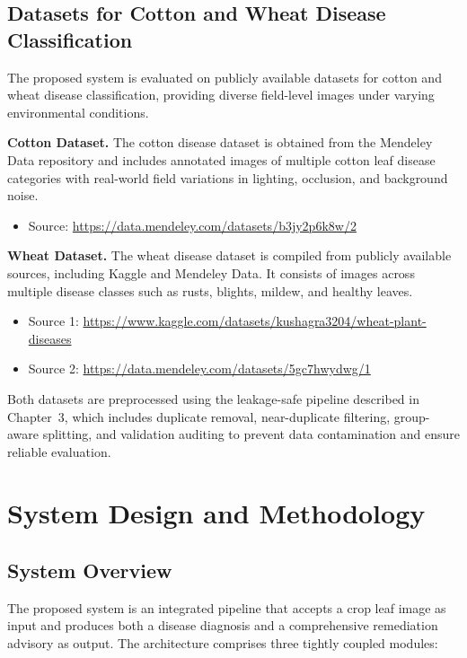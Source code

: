 \documentclass[12pt,a4paper]{report}
\begin{document}
\section{Datasets for Cotton and Wheat Disease Classification}
The proposed system is evaluated on publicly available datasets for cotton and wheat disease classification, providing diverse field-level images under varying environmental conditions.

\textbf{Cotton Dataset.} The cotton disease dataset is obtained from the Mendeley Data repository and includes annotated images of multiple cotton leaf disease categories with real-world field variations in lighting, occlusion, and background noise.
\begin{itemize}
    \item Source: \url{https://data.mendeley.com/datasets/b3jy2p6k8w/2}
\end{itemize}

\textbf{Wheat Dataset.} The wheat disease dataset is compiled from publicly available sources, including Kaggle and Mendeley Data. It consists of images across multiple disease classes such as rusts, blights, mildew, and healthy leaves.
\begin{itemize}
    \item Source 1: \url{https://www.kaggle.com/datasets/kushagra3204/wheat-plant-diseases}
    \item Source 2: \url{https://data.mendeley.com/datasets/5gc7hwydwg/1}
\end{itemize}

Both datasets are preprocessed using the leakage-safe pipeline described in Chapter~3, which includes duplicate removal, near-duplicate filtering, group-aware splitting, and validation auditing to prevent data contamination and ensure reliable evaluation.

\chapter{System Design and Methodology}

\section{System Overview}
The proposed system is an integrated pipeline that accepts a crop leaf image as input and produces both a disease diagnosis and a comprehensive remediation advisory as output. The architecture comprises three tightly coupled modules:
\end{document}
